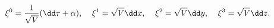 \begin{equation}
\xi^0={1\over\sqrt{V}}(\dd\tau +\alpha
),\:\:\:\:\:\xi^1=\sqrt{V}\dd x
,\:\:\:\:\:\xi^2=\sqrt{V}\dd y,\:\:\:\:\:\xi^3=\sqrt{V}\dd z.
\label{bazis}
\end{equation}

